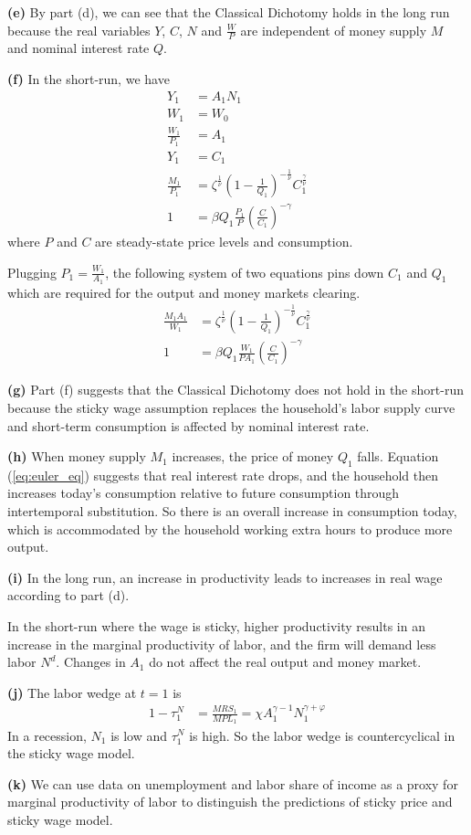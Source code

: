 \documentclass[12pt]{article}
\begin{document}
\textbf{(e)} By part (d), we can see that the Classical Dichotomy holds in the long run because the real variables $Y$, $C$, $N$ and $\frac{W}{P}$ are independent of money supply $M$ and nominal interest rate $Q$.

\textbf{(f)} In the short-run, we have 
\begin{align*}
Y_{1} &= A_{1}N_{1} \\
W_{1} &= W_{0} \\
\frac{W_{1}}{P_{1}} &= A_{1} \\
Y_{1} &= C_{1} \\
\frac{M_{1}}{P_{1}} &= \zeta^{\frac{1}{\nu}}\left(1-\frac{1}{Q_{1}}\right)^{-\frac{1}{\nu}}C^{\frac{\gamma}{\nu}}_{1} \\
1 &= \beta Q_{1} \frac{P_{1}}{P} \left(\frac{C}{C_{1}}\right)^{-\gamma}
\end{align*}
where $P$ and $C$ are steady-state price levels and consumption.

Plugging $P_{1}=\frac{W_{1}}{A_{1}}$, the following system of two equations pins down $C_{1}$ and $Q_{1}$ which are required for the output and money markets clearing.
\begin{align}
\label{eq:money_demand}
\frac{M_{1}A_{1}}{W_{1}} &= \zeta^{\frac{1}{\nu}}\left(1-\frac{1}{Q_{1}}\right)^{-\frac{1}{\nu}}C^{\frac{\gamma}{\nu}}_{1} \\
\label{eq:euler_eq}
1 &= \beta Q_{1} \frac{W_{1}}{PA_{1}} \left(\frac{C}{C_{1}}\right)^{-\gamma}
\end{align}

\textbf{(g)} Part (f) suggests that the Classical Dichotomy does not hold in the short-run because the sticky wage assumption replaces the household's labor supply curve and short-term consumption is affected by nominal interest rate.

\textbf{(h)} When money supply $M_{1}$ increases, the price of money $Q_{1}$ falls. 
Equation (\ref{eq:euler_eq}) suggests that real interest rate drops, 
and the household then increases today's consumption relative to future consumption through intertemporal substitution. 
So there is an overall increase in consumption today, 
which is accommodated by the household working extra hours to produce more output.

\textbf{(i)} In the long run, an increase in productivity leads to increases in 
real wage according to part (d).

In the short-run where the wage is sticky, higher productivity results in an increase in the marginal productivity of labor, and the firm will demand less labor $N^{d}$. 
Changes in $A_{1}$ do not affect the real output and money market.  

\textbf{(j)} The labor wedge at $t=1$ is
\begin{align*}
1-\tau^{N}_{1} &= \frac{MRS_{1}}{MPL_{1}} = \chi A^{\gamma-1}_{1}N^{\gamma+\varphi}_{1}
\end{align*}
In a recession, $N_{1}$ is low and $\tau^{N}_{1}$ is high.
So the labor wedge is countercyclical in the sticky wage model.

\textbf{(k)} We can use data on unemployment and labor share of income as a proxy for marginal productivity of labor to distinguish the predictions of sticky price and sticky wage model.
\end{document}
